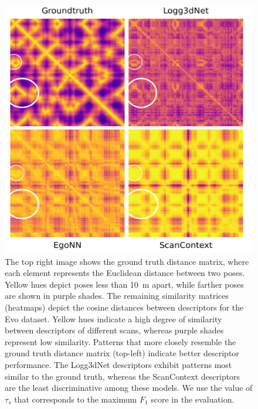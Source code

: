 \begin{figure}[t]
  \centering
  \includegraphics[width=0.85\linewidth]{pics/exp_1.2_heatmap_evo12_plasma_edit}
  \caption{The top right image shows the ground truth distance matrix, where each element represents the Euclidean distance between two poses. Yellow hues depict poses less than \SI{10}{\meter} apart, while farther poses are shown in purple shades. The remaining similarity matrices (heatmaps) depict the cosine distances between descriptors for the Evo dataset. Yellow hues indicate a high degree of similarity between descriptors of different scans, whereas purple shades represent low similarity. Patterns that more closely resemble the ground truth distance matrix (top-left) indicate better descriptor performance. The Logg3dNet descriptors exhibit patterns most similar to the ground truth, whereas the ScanContext descriptors are the least discriminative among these models. We use the value of $\tau_{s}$ that corresponds to the maximum $F_{1}$ score in the evaluation.}
  \label{fig:heatmap_evo12}
\end{figure}


